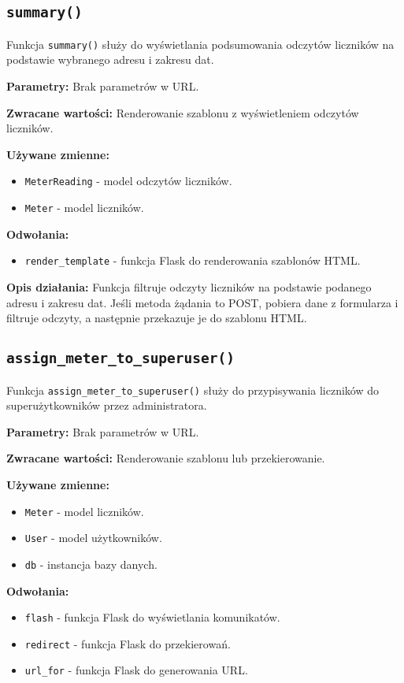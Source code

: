 \documentclass[12pt,a4paper]{report}
\begin{document}
\subsection{\texttt{summary()}}
\label{sec:summary}
Funkcja \texttt{summary()} służy do wyświetlania podsumowania odczytów liczników na podstawie wybranego adresu i zakresu dat.

\textbf{Parametry:} Brak parametrów w URL.

\textbf{Zwracane wartości:} Renderowanie szablonu z wyświetleniem odczytów liczników.

\textbf{Używane zmienne:}
\begin{itemize}
    \item \texttt{MeterReading} - model odczytów liczników.
    \item \texttt{Meter} - model liczników.
\end{itemize}

\textbf{Odwołania:}
\begin{itemize}
    \item \texttt{render\_template} - funkcja Flask do renderowania szablonów HTML.
\end{itemize}

\textbf{Opis działania:}
Funkcja filtruje odczyty liczników na podstawie podanego adresu i zakresu dat. Jeśli metoda żądania to POST, pobiera dane z formularza i filtruje odczyty, a następnie przekazuje je do szablonu HTML.

\subsection{\texttt{assign\_meter\_to\_superuser()}}
\label{sec:assign_meter_to_superuser}
Funkcja \texttt{assign\_meter\_to\_superuser()} służy do przypisywania liczników do superużytkowników przez administratora.

\textbf{Parametry:} Brak parametrów w URL.

\textbf{Zwracane wartości:} Renderowanie szablonu lub przekierowanie.

\textbf{Używane zmienne:}
\begin{itemize}
    \item \texttt{Meter} - model liczników.
    \item \texttt{User} - model użytkowników.
    \item \texttt{db} - instancja bazy danych.
\end{itemize}

\textbf{Odwołania:}
\begin{itemize}
    \item \texttt{flash} - funkcja Flask do wyświetlania komunikatów.
    \item \texttt{redirect} - funkcja Flask do przekierowań.
    \item \texttt{url\_for} - funkcja Flask do generowania URL.
\end{itemize}
\end{document}

